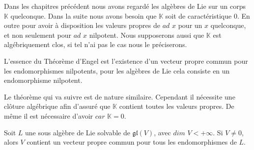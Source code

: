\documentclass[a4paper,openany,12pt]{report}
\newcommand{\KK}{\mathbb{K}}
\newcommand{\gl}{\mathfrak{gl}}
\theoremstyle{break}
{\theorembodyfont{\upshape}
\newtheorem*{rmq}{Remarque :}
\newtheorem*{prv}{Preuve :}
\newtheorem*{ex}{Exemples :}
\newtheorem*{exe}{Exemple : }
\newtheorem*{nota}{Notation :}
\newtheorem*{dem}{D\'emonstration :}}
\begin{document}
\quad Dans les chapitres précédent nous avons regardé les algèbres de Lie sur un corps $\KK$ quelconque. Dans la suite nous avons besoin que $\KK$ soit de caractéristique $0$. En outre pour avoir à disposition les valeurs propres de $ad$ $x$ pour un $x$ quelconque, et non seulement pour $ad$ $x$ nilpotent. Nous supposerons aussi que $\KK$ est algébriquement clos, si tel n'ai pas le cas nous le préciserons.

\quad L'essence du Théorème d'Engel est l’existence d'un vecteur propre commun pour les endomorphismes nilpotents, pour les algèbres de Lie cela consiste en un endomorphisme nilpotent.

\quad Le théorème qui va suivre est de nature similaire. Cependant il nécessite une clôture algébrique afin d'assuré que $\KK$ contient toutes les valeurs propres. De même il est nécessaire d'avoir $car$ $\KK =0$.

\begin{thm}\label{thm:L1}
\quad Soit $L$ une sous algèbre de Lie solvable de $\gl(V)$, avec $dim$ $V < +\infty$. Si $V \neq 0$, alors $V$ contient un vecteur propre commun pour tous les endomorphismes de $L$.
\end{thm}
\end{document}
